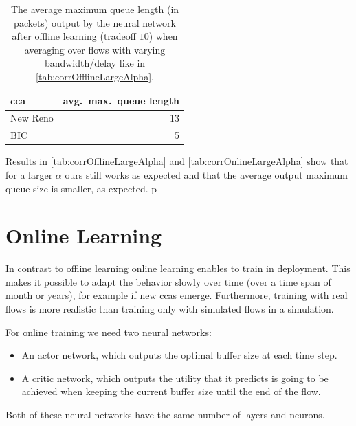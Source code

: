 \documentclass[conference]{IEEEtran}
\begin{document}
\begin{table}[h]
\caption{The average maximum queue length (in packets) output by the neural network after offline learning (tradeoff $10$) when averaging over flows with varying bandwidth/delay like in \autoref{tab:corrOfflineLargeAlpha}.} \label{tab:avgOfflineLargeAlpha}
\centering
\begin{tabular}{lr} \toprule
\gls{cca} & avg.~max.~queue length \\ \midrule
New Reno & 13 \\
BIC & 5 \\
\bottomrule
\end{tabular}
\end{table}

Results in \autoref{tab:corrOfflineLargeAlpha} and \autoref{tab:corrOnlineLargeAlpha} show that for a larger $\alpha$ \gls{ours} still works as expected and that the average output maximum queue size is smaller, as expected. p

\section{Online Learning}

In contrast to offline learning online learning enables to train in deployment. This makes it possible to adapt the behavior slowly over time (over a time span of month or years), for example if new \glspl{cca} emerge. Furthermore, training with real flows is more realistic than training only with simulated flows in a simulation. 

For online training we need two neural networks: 
\begin{itemize}
\item An actor network, which outputs the optimal buffer size at each time step.
\item A critic network, which outputs the utility that it predicts is going to be achieved when keeping the current buffer size until the end of the flow. 
\end{itemize}
Both of these neural networks have the same number of layers and neurons. 
\end{document}
